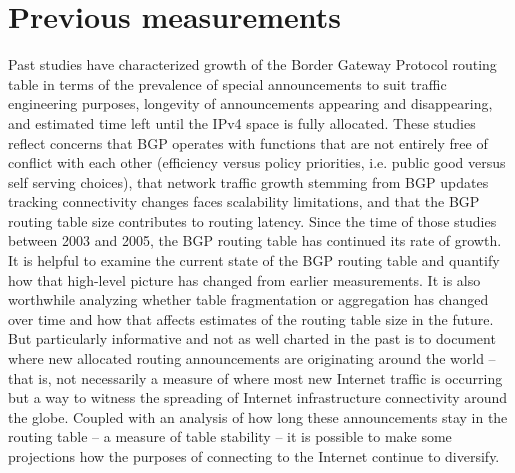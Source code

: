 
\section{Previous measurements}
\label{sec:related_work}

Past studies have characterized growth of the Border Gateway Protocol routing table in terms of the prevalence of special announcements to suit traffic engineering purposes, longevity of announcements appearing and disappearing, and estimated time left until the IPv4 space is fully allocated.  These studies reflect concerns that BGP operates with functions that are not entirely free of conflict with each other (efficiency versus policy priorities, i.e. public good versus self serving choices), that network traffic growth stemming from BGP updates tracking connectivity changes faces scalability limitations, and that the BGP routing table size contributes to routing latency.  Since the time of those studies between 2003 and 2005, the BGP routing table has continued its rate of growth.  It is helpful to examine the current state of the BGP routing table and quantify how that high-level picture has changed from earlier measurements.  It is also worthwhile analyzing whether table fragmentation or aggregation has changed over time and how that affects estimates of the routing table size in the future.  But particularly informative and not as well charted in the past is to document where new allocated routing announcements are originating around the world -- that is, not necessarily a measure of where most new Internet traffic is occurring but a way to witness the spreading of Internet infrastructure connectivity around the globe.  Coupled with an analysis of how long these announcements stay in the routing table -- a measure of table stability -- it is possible to make some projections how the purposes of connecting to the Internet continue to diversify. 